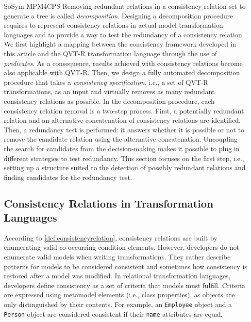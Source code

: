 \begin{copiedFrom}{SoSym MPM4CPS}
Removing redundant relations in a consistency relation set to generate a tree is called \textit{decomposition}. Designing a decomposition procedure requires to represent consistency relations in actual model transformation languages and to provide a way to test the redundancy of a consistency relation. We first highlight a mapping between the consistency framework developed in this article and the QVT-R transformation language through the use of \textit{predicates}. As a consequence, results achieved with consistency relations become also applicable with QVT-R. Then, we design a fully automated decomposition procedure that takes a \emph{consistency specification}, i.e., a set of QVT-R transformations, as an input and virtually removes as many redundant consistency relations as possible. In the decomposition procedure, each consistency relation removal is a two-step process. First, a potentially redundant relation and an alternative concatenation of consistency relations are identified. Then, a redundancy test is performed: it answers whether it is possible or not to remove the candidate relation using the alternative concatenation. Uncoupling the search for candidates from the decision-making makes it possible to plug in different strategies to test redundancy. This section focuses on the first step, i.e., setting up a structure suited to the detection of possibly redundant relations and finding candidates for the redundancy test.

\subsection{Consistency Relations in Transformation Languages}

According to \autoref{def:consistencyrelation}, consistency relations are built by enumerating valid co-occurring condition elements. However, developers do not enumerate valid models when writing transformations. %
They rather describe patterns for models to be considered consistent and sometimes how consistency is restored after a model was modified. %
In relational transformation languages, developers define consistency as a set of criteria that models must fulfill. Criteria are expressed using metamodel elements (i.e., class properties), as objects are only distinguished by their contents. For example, an \texttt{Employee} object and a \texttt{Person} object are considered consistent if their \texttt{name} attributes are equal.


\end{copiedFrom}
